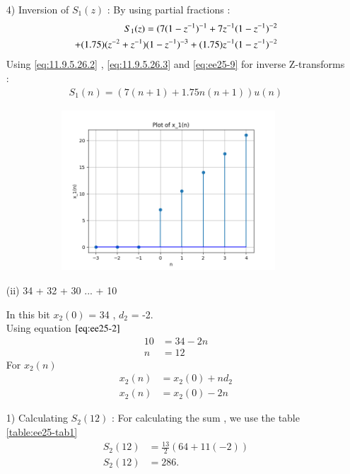 \documentclass[journal,12pt,twocolumn]{IEEEtran}
\theoremstyle{remark}
\begin{document}
\begin{enumerate}
    \item[4)]
Inversion of $S_1(z)$ :
By using partial fractions :
\begin{align}
    S_1(z) = \notag(7(1-z^{-1})^{-1} + 7z^{-1}(1-z^{-1})^{-2} \\+ (1.75)(z^{-2} + z^{-1})(1-z^{-1})^{-3} + (1.75)z^{-1}(1-z^{-1})^{-2}  
\end{align}
Using \eqref{eq:11.9.5.26.2} , \eqref{eq:11.9.5.26.3} and \eqref{eq:ee25-9} for inverse Z-transforms :
\begin{align}
 S_1(n) = (7(n+1) + 1.75n(n+1))u(n)
\end{align}
    \begin{figure}[!ht]
    \centering
\graphicspath{ {figs/} }
\includegraphics[width=10cm, height=6cm]{graph_1}
\captionsetup{Graph:1 $x_1(n)$ vs n }
\label{graph:ee25-g2}
\end{figure}
    











\vspace{0.5cm}
\item[(ii)]
 34 + 32 + 30 ... + 10
\vspace{0.2cm}

In this bit  $x_2(0)$ = 34 , $d_2$ = -2.\\
Using equation $\eqref{eq:ee25-2}$
\begin{align}
     10 &= 34 -2n\\
     n &= 12 
     \end{align}
For $x_2(n)$
\begin{align}
x_2(n) &= x_2(0) + nd_2\\
x_2(n) &= x_2(0) -2n
\end{align}


\item[1)] 
Calculating $S_2(12)$ :
For calculating the sum , we use the table \ref{table:ee25-tab1}
\begin{align}
 S_2{(12)} &= \frac{13}{2}(64+11(-2))\\
 S_2{(12)} &= 286.
 \end{align}


\end{enumerate}
\end{document}
